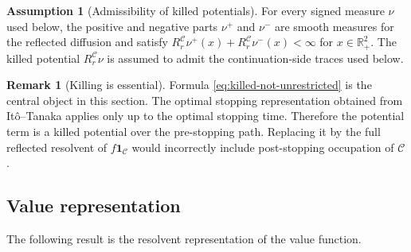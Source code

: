 \documentclass[pdflatex,sn-mathphys-num]{sn-jnl}
\theoremstyle{plain}
\theoremstyle{definition}
\newtheorem{assumption}[theorem]{Assumption}
\newtheorem{remark}[theorem]{Remark}
\newcommand{\R}{\mathbb{R}}
\begin{document}
\begin{assumption}[Admissibility of killed potentials]
\label{ass:killed-potential-admissibility}
For every signed measure $\nu$ used below, the positive and negative parts
$\nu^+$ and $\nu^-$ are smooth measures for the reflected diffusion and satisfy
$R_r^{\mathcal C}\nu^+(x)+R_r^{\mathcal C}\nu^-(x)<\infty$ for $x\in\R^2_+$. The
killed potential $R_r^{\mathcal C}\nu$ is assumed to admit the
continuation-side traces used below.
\end{assumption}

\begin{remark}[Killing is essential]
\label{rem:killing-essential}
Formula \eqref{eq:killed-not-unrestricted} is the central object in this
section. The optimal stopping representation obtained from It\^o--Tanaka
applies only up to the optimal stopping time. Therefore the potential term is a
killed potential over the pre-stopping path. Replacing it by the full reflected
resolvent of $f\mathbf 1_{\mathcal C}$ would incorrectly include post-stopping
occupation of $\mathcal C$.
\end{remark}

\subsection{Value representation}
\label{sec:correct-value-representation}
The following result is the resolvent representation of the value
function.
\end{document}
